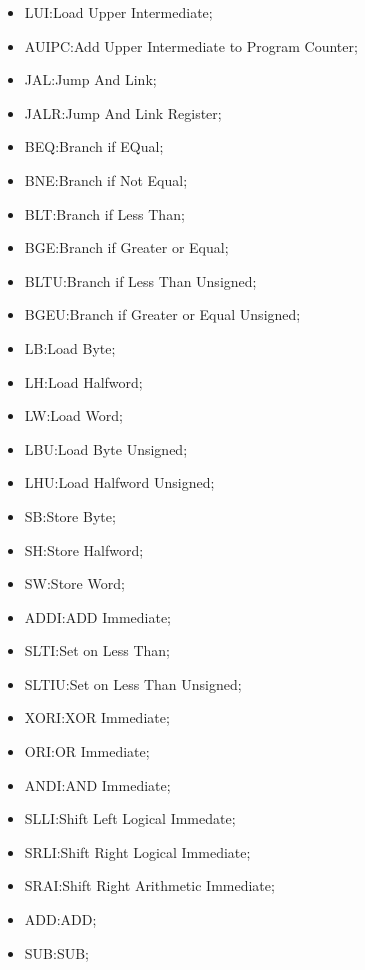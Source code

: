         \begin{itemize}[leftmargin=20mm]
            \item {LUI:\@ Load Upper Intermediate;}
            \item {AUIPC:\@ Add Upper Intermediate to Program Counter;}
            \item {JAL:\@ Jump And Link;}
            \item {JALR:\@ Jump And Link Register;}
            \item {BEQ:\@ Branch if EQual;}
            \item {BNE:\@ Branch if Not Equal;}
            \item {BLT:\@ Branch if Less Than;}
            \item {BGE:\@ Branch if Greater or Equal;}
            \item {BLTU:\@ Branch if Less Than Unsigned;}
            \item {BGEU:\@ Branch if Greater or Equal Unsigned;}
            \item {LB:\@ Load Byte;}
            \item {LH:\@ Load Halfword;}
            \item {LW:\@ Load Word;}
            \item {LBU:\@ Load Byte Unsigned;}
            \item {LHU:\@ Load Halfword Unsigned;}
            \item {SB:\@ Store Byte;}
            \item {SH:\@ Store Halfword;}
            \item {SW:\@ Store Word;}
            \item {ADDI:\@ ADD Immediate;}
            \item {SLTI:\@ Set on Less Than;}
            \item {SLTIU:\@ Set on Less Than Unsigned;}
            \item {XORI:\@ XOR Immediate;}
            \item {ORI:\@ OR Immediate;}
            \item {ANDI:\@ AND Immediate;}
            \item {SLLI:\@ Shift Left Logical Immedate;}
            \item {SRLI:\@ Shift Right Logical Immediate;}
            \item {SRAI:\@ Shift Right Arithmetic Immediate;}
            \item {ADD:\@ ADD;}
            \item {SUB:\@ SUB;}

\end{itemize}
